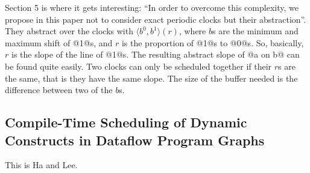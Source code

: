 Section 5 is where it gets interesting: ``In order to overcome this complexity, we propose in this paper not to consider exact periodic clocks but their abstraction''.
They abstract over the clocks with $\langle b^0, b^1 \rangle (r)$, where $b$s are the minimum and maximum shift of @1@s, and $r$ is the proportion of @1@s to @0@s.
So, basically, $r$ is the slope of the line of @1@s. The resulting abstract slope of @a on b@ can be found quite easily.
Two clocks can only be scheduled together if their $r$s are the same, that is they have the same slope.
The size of the buffer needed is the difference between two of the $b$s.

\subsection{Compile-Time Scheduling of Dynamic Constructs in Dataflow Program Graphs}
This is Ha and Lee\cite{ha1997compile}.

